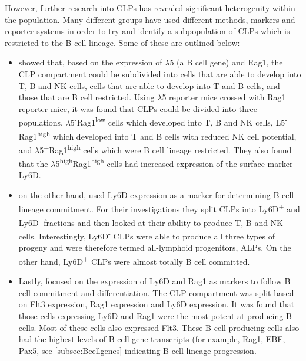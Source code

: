 However, further research into CLPs has revealed significant heterogenity within the population.
Many different groups have used different methods, markers and reporter systems in order to try and identify a subpopulation of CLPs which is restricted to the B cell lineage. 
Some of these are outlined below:
\begin{itemize}
\item \citet{Mansson2010} showed that, based on the expression of $\lambda$5 (a B cell gene) and Rag1, the CLP compartment could be subdivided into cells that are able to develop into T, B and NK cells, cells that are able to develop into T and B cells, and those that are B cell restricted.
Using $\lambda$5 reporter mice crossed with Rag1 reporter mice, it was found that CLPs could be divided into three populations.
$\lambda$5\textsuperscript{-}Rag1\textsuperscript{low} cells which developed into T, B and NK cells, L5\textsuperscript{-}Rag1\textsuperscript{high} which developed into T and B cells with reduced NK cell potential, and $\lambda$5\textsuperscript{+}Rag1\textsuperscript{high} cells which were B cell lineage restricted.
They also found that the $\lambda$5\textsuperscript{high}Rag1\textsuperscript{high} cells had increased expression of the surface marker Ly6D.
\item \citet{Inlay2009} on the other hand, used Ly6D expression as a marker for determining B cell lineage commitment.
For their investigations they split CLPs into Ly6D\textsuperscript{+} and Ly6D\textsuperscript{-} fractions and then looked at their ability to produce T, B and NK cells.
Interestingly, Ly6D\textsuperscript{-} CLPs were able to produce all three types of progeny and were therefore termed all-lymphoid progenitors, ALPs.
On the other hand, Ly6D\textsuperscript{+} CLPs were almost totally B cell committed.
\item Lastly, \citet{Zhang2013} focused on the expression of Ly6D and Rag1 as markers to follow B cell commitment and differentiation.
The CLP compartment was split based on Flt3 expression, Rag1 expression and Ly6D expression.
It was found that those cells expressing Ly6D and Rag1 were the most potent at producing B cells. 
Most of these cells also expressed Flt3.
These B cell producing cells also had the highest levels of B cell gene transcripts (for example, Rag1, EBF, Pax5, see \cref{subsec:Bcellgenes} indicating B cell lineage progression.
\end{itemize}

